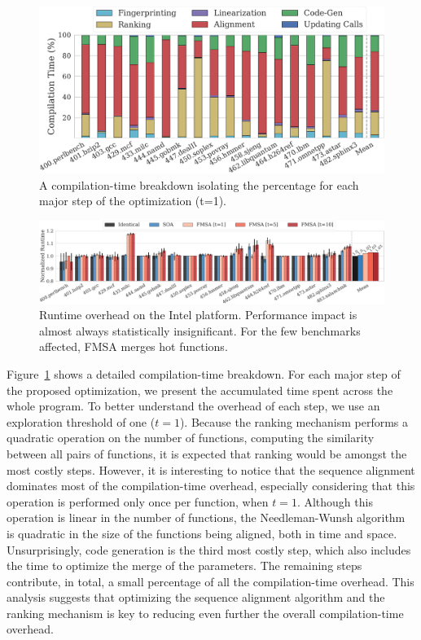 \begin{figure}[t]
  \centering
  \includegraphics[width=1.0\linewidth]{figs/compilation-time-breakdown-sqrd.pdf}
  \caption{A compilation-time breakdown isolating the percentage for each major
           step of the optimization (t=1).}%
  \label{fig:compilation-time-breakdown}
\end{figure}

\begin{figure}[t]
  \centering
  \includegraphics[width=\linewidth]{figs/runtime-impact.pdf}
  \caption{Runtime overhead on the Intel platform. Performance impact is almost always statistically insignificant. For the few benchmarks affected, FMSA merges hot functions.}
  \label{fig:runtime-impact}
\end{figure}

Figure~\ref{fig:compilation-time-breakdown} shows a detailed compilation-time breakdown. For each major step of the proposed optimization,
we present the accumulated time spent across the whole program. To better understand the overhead of each step, we use an exploration threshold of one ($t = 1$). Because the ranking mechanism performs a quadratic operation on the number of functions, computing
the similarity between all pairs of functions, it is expected that ranking would be amongst the most costly steps. However, it is
interesting to notice that the sequence alignment dominates most of the compilation-time overhead, especially considering that this
operation is performed only once per function, when $t = 1$. Although this operation is linear in the number of functions, the
Needleman-Wunsh algorithm~\cite{needleman70} is quadratic in the size of the functions being aligned, both in time and space.
Unsurprisingly, code generation is the third most costly step, which also includes the time to optimize the merge of the parameters. The
remaining steps contribute, in total, a small percentage of all the compilation-time overhead. This analysis suggests that optimizing the
sequence alignment algorithm and the ranking mechanism is key to reducing even further the overall compilation-time overhead.

